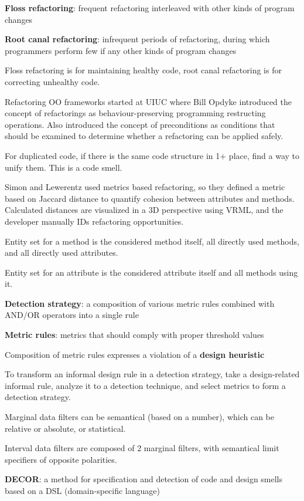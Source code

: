 \documentclass[11pt]{article}
\begin{document}
\textbf{Floss refactoring}: frequent refactoring interleaved with other kinds of program changes

\textbf{Root canal refactoring}: infrequent periods of refactoring, during which programmers perform few if
any other kinds of program changes

Floss refactoring is for maintaining healthy code, root canal refactoring is for correcting unhealthy code.

Refactoring OO frameworks started at UIUC where Bill Opdyke introduced the concept of refactorings as
behaviour-preserving programming restructing operations.
Also introduced the concept of preconditions as conditions that should be examined to determine whether
a refactoring can be applied safely.

For duplicated code, if there is the same code structure in 1+ place, find a way to unify them.
This is a code smell.

Simon and Lewerentz used metrics based refactoring, so they defined a metric based on Jaccard distance
to quantify cohesion between attributes and methods.
Calculated distances are visualized in a 3D perspective using VRML, and the developer manually IDs
refactoring opportunities.

Entity set for a method is the considered method itself, all directly used methods, and all directly
used attributes.

Entity set for an attribute is the considered attribute itself and all methods using it.

\textbf{Detection strategy}: a composition of various metric rules combined with AND/OR operators into a
single rule

\textbf{Metric rules}: metrics that should comply with proper threshold values

Composition of metric rules expresses a violation of a \textbf{design heuristic}

To transform an informal design rule in a detection strategy,
take a design-related informal rule, analyze it to a detection technique, and select metrics to
form a detection strategy.

Marginal data filters can be semantical (based on a number), which can be relative or absolute,
or statistical.

Interval data filters are composed of 2 marginal filters, with semantical limit specifiers of
opposite polarities.

\textbf{DECOR}: a method for specification and detection of code and design smells based on a DSL
(domain-specific language)
\end{document}
